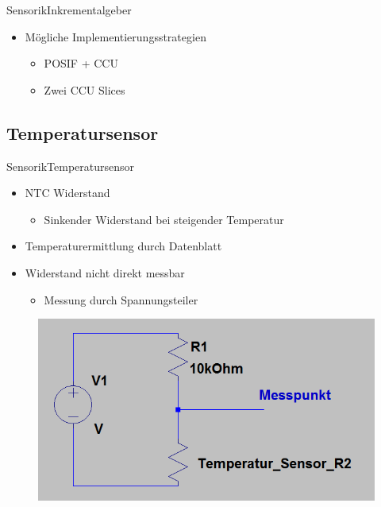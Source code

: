 \begin{frame}{Sensorik}{Inkrementalgeber}	
 \begin{itemize}
 \item Mögliche Implementierungsstrategien
 \begin{itemize}
 \item POSIF + CCU
 \item Zwei CCU Slices
 \end{itemize}
 \end{itemize}
\end{frame}


\subsection{Temperatursensor}

\begin{frame}{Sensorik}{Temperatursensor}	
 \begin{itemize}
 \item NTC Widerstand
 \begin{itemize}
 \item Sinkender Widerstand bei steigender Temperatur
 \end{itemize}
 \item Temperaturermittlung durch Datenblatt
 \item Widerstand nicht direkt messbar
 \begin{itemize}
 \item Messung durch Spannungsteiler
 \end{itemize}
 \end{itemize}
 \begin{figure} [htbp]
 \centering
 \includegraphics[scale=0.3]{Sensor/temperature_circuit.PNG}
 \end{figure}
\end{frame}


